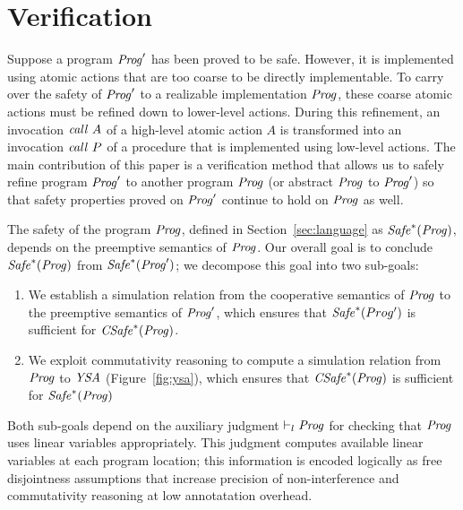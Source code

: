 \section{Verification}
\label{sec:verification}

Suppose a program $\mathit{Prog}'$ has been proved to be safe.
However, it is implemented using atomic actions that are too coarse to be directly implementable.  
To carry over the safety of $\mathit{Prog}'$ to a realizable implementation $\mathit{Prog}$, 
these coarse atomic actions must be refined down to lower-level actions.
During this refinement, an invocation $\mathit{call}\ A$ of a high-level atomic action $A$ is transformed into an 
invocation $\mathit{call}\ P$ of a procedure that is implemented using low-level actions.
The main contribution of this paper is a verification method that allows us to safely refine
program $\mathit{Prog}'$ to another program $\mathit{Prog}$ (or abstract $\mathit{Prog}$ to $\mathit{Prog}'$) so that 
safety properties proved on $\mathit{Prog}'$ continue to hold on $\mathit{Prog}$ as well.

The safety of the program $\mathit{Prog}$, defined in Section~\ref{sec:language} as $\mathit{Safe}^*(\mathit{Prog})$, depends on 
the preemptive semantics of $\mathit{Prog}$.
Our overall goal is to conclude $\mathit{Safe}^*(\mathit{Prog})$ from $\mathit{Safe}^*(\mathit{Prog}')$;
we decompose this goal into two sub-goals:
\begin{enumerate}
\item
We establish a simulation relation from the cooperative semantics of $\mathit{Prog}$ 
to the preemptive semantics of $\mathit{Prog}'$, which ensures that $\mathit{Safe}^*(Prog')$ is sufficient for $\mathit{CSafe}^*(\mathit{Prog})$.
\item
We exploit commutativity reasoning to compute a simulation relation from $\mathit{Prog}$ to $\mathit{YSA}$ (Figure~\ref{fig:ysa}),
which ensures that $\mathit{CSafe}^*(\mathit{Prog})$ is sufficient for $\mathit{Safe}^*(\mathit{Prog})$
\end{enumerate}
Both sub-goals depend on the auxiliary judgment $\vdash_l \mathit{Prog}$ for checking that $\mathit{Prog}$ uses linear variables appropriately.
This judgment computes available linear variables at each program location;
this information is encoded logically as free disjointness assumptions that increase precision of non-interference
and commutativity reasoning at low annotatation overhead.

